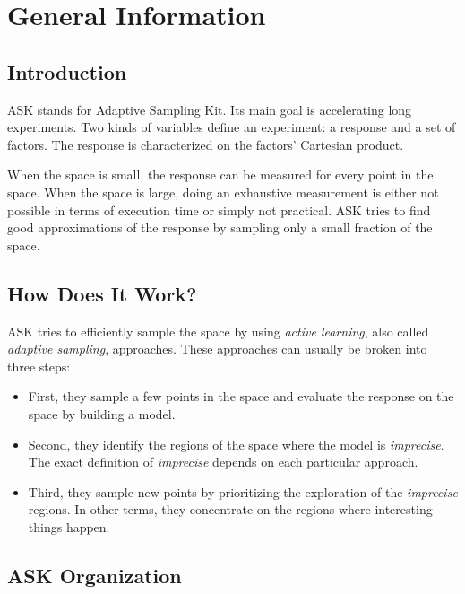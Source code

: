 \chapter{General Information}
\section{Introduction}

ASK stands for Adaptive Sampling Kit. Its main goal is accelerating long experiments. Two kinds of variables define an experiment: a response and a set of factors. The response is characterized on the factors' Cartesian product.

When the space is small, the response can be measured for every point in the space. When the space is large, doing an exhaustive measurement is either not possible in terms of execution time or simply not practical. ASK tries to find good approximations of the response by sampling only a small fraction of the space.

\section{How Does It Work?}

ASK tries to efficiently sample the space by using \emph{active learning}, also called \emph{adaptive sampling}, approaches.
These approaches can usually be broken into three steps:
\begin{itemize}
	\item First, they sample a few points in the space and evaluate the response on the space by building a model.
\end{itemize}

\begin{itemize}
	\item Second, they identify the regions of the space where the model is \emph{imprecise}. The exact definition of \emph{imprecise} depends on each particular approach.
\end{itemize}

\begin{itemize}
	\item Third, they sample new points by prioritizing the exploration of the \emph{imprecise} regions. In other terms, they concentrate on the regions where interesting things happen.
\end{itemize}

\section{ASK Organization}

